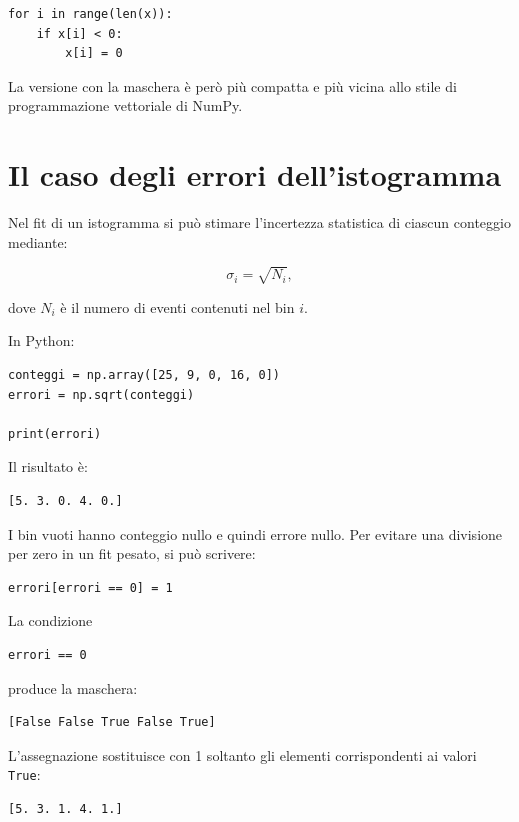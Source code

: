 \documentclass[11pt,a4paper]{book}
\begin{document}
\begin{lstlisting}
for i in range(len(x)):
    if x[i] < 0:
        x[i] = 0
\end{lstlisting}

La versione con la maschera è però più compatta e più vicina allo stile di programmazione vettoriale di NumPy.

\section{Il caso degli errori dell'istogramma}

Nel fit di un istogramma si può stimare l'incertezza statistica di ciascun conteggio mediante:

\[
\sigma_i = \sqrt{N_i},
\]

dove $N_i$ è il numero di eventi contenuti nel bin $i$.

In Python:

\begin{lstlisting}
conteggi = np.array([25, 9, 0, 16, 0])
errori = np.sqrt(conteggi)

print(errori)
\end{lstlisting}

Il risultato è:

\begin{lstlisting}
[5. 3. 0. 4. 0.]
\end{lstlisting}

I bin vuoti hanno conteggio nullo e quindi errore nullo. Per evitare una divisione per zero in un fit pesato, si può scrivere:

\begin{lstlisting}
errori[errori == 0] = 1
\end{lstlisting}

La condizione

\begin{lstlisting}
errori == 0
\end{lstlisting}

produce la maschera:

\begin{lstlisting}
[False False True False True]
\end{lstlisting}

L'assegnazione sostituisce con 1 soltanto gli elementi corrispondenti ai valori \texttt{True}:

\begin{lstlisting}
[5. 3. 1. 4. 1.]
\end{lstlisting}
\end{document}
